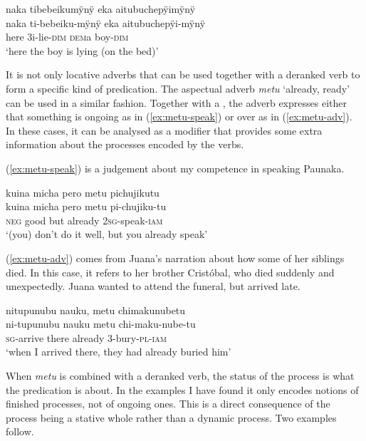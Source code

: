 \ea\label{ex:LOC-noRC-2}
\begingl
\glpreamble naka tibebeikumÿnÿ eka aitubuchepÿimÿnÿ\\
\gla naka ti-bebeiku-mÿnÿ eka aitubuchepÿi-mÿnÿ\\
\glb here 3i-lie-\textsc{dim} \textsc{dem}a boy-\textsc{dim}\\
\glft ‘here the boy is lying (on the bed)’
\endgl
\trailingcitation{[mox-a110920l-2.034]}
\xe


It is not only locative adverbs that can be used together with a deranked verb to form a specific kind of predication. The aspectual adverb \textit{metu} ‘already, ready’ can be used in a similar fashion. Together with a , the adverb expresses either that something is ongoing as in (\ref{ex:metu-speak}) or over as in (\ref{ex:metu-adv}). In these cases, it can be analysed as a modifier that provides some extra information about the processes encoded by the verbs.

(\ref{ex:metu-speak}) is a judgement about my competence in speaking Paunaka.

\ea\label{ex:metu-speak}
\begingl
\glpreamble kuina micha pero metu pichujikutu\\
\gla kuina micha pero metu pi-chujiku-tu\\
\glb \textsc{neg} good but already 2\textsc{sg}-speak-\textsc{iam}\\
\glft ‘(you) don’t do it well, but you already speak’
\endgl
\trailingcitation{[mrx-c120509l.068]}
\xe

(\ref{ex:metu-adv}) comes from Juana’s narration about how some of her siblings died. In this case, it refers to her brother Cristóbal, who died suddenly and unexpectedly. Juana wanted to attend the funeral, but arrived late.

\ea\label{ex:metu-adv}
\begingl
\glpreamble nitupunubu nauku, metu chimakunubetu\\
\gla ni-tupunubu nauku metu chi-maku-nube-tu\\
\textsc{sg}-arrive there already 3-bury-\textsc{pl}-\textsc{iam}\\
\glft ‘when I arrived there, they had already buried him’
\endgl
\trailingcitation{[jxx-p120430l-2.461]}
\xe

When \textit{metu} is combined with a deranked verb, the status of the process is what the predication is about. In the examples I have found it only encodes notions of finished processes, not of ongoing ones. This is a direct consequence of the process being a stative whole rather than a dynamic process. Two examples follow.


